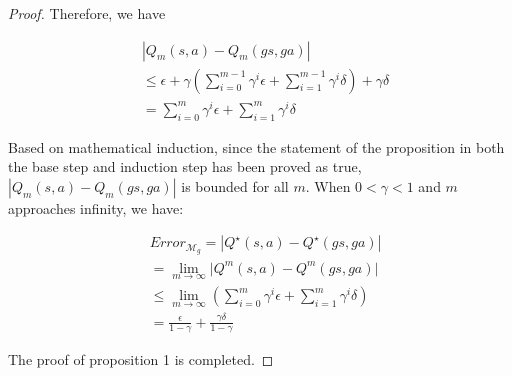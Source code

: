 \documentclass[letterpaper]{article} %
\theoremstyle{definition}
\begin{document}
\begin{proof}
Therefore, we have

{\scriptsize
\begin{equation*}
\begin{aligned}
& \left|Q_m(s, a) - Q_m(gs, ga)\right| \\
& \leq \epsilon +\gamma \left(\sum_{i=0}^{m-1} \gamma^i\epsilon + \sum_{i=1}^{m-1}\gamma^i \delta\right) +\gamma \delta\\
& = \sum_{i=0}^{m} \gamma^i\epsilon + \sum_{i=1}^{m}\gamma^i \delta
\end{aligned}
\end{equation*}}

Based on mathematical induction, since the statement of the proposition in both the base step and  induction step has been proved as true, $|Q_{m}(s, a) - Q_{m}(gs, ga)|$ is bounded for all $m$. When $0<\gamma <1$ and $m$ approaches infinity, we have:

{\scriptsize
\begin{equation*}
\begin{aligned}
& \textit{Error}_{\mathcal{M}_g}=|Q^{\star}(s, a) - Q^{\star}(gs, ga)| \\
& = \lim_{{m \to \infty}} \Biggl |Q^{m}(s, a) - Q^{m}(gs, ga)\Biggl | \\
    &\leq\lim_{{m \to \infty}} \left(\sum_{{i=0}}^{m} \gamma^i\epsilon + \sum_{{i=1}}^{m}\gamma^i \delta\right) \\
    & = \frac{\epsilon}{1-\gamma}+\frac{\gamma \delta}{1-\gamma}
\end{aligned}
\end{equation*}}

The proof of proposition 1 is completed.
\end{proof}
\end{document}
